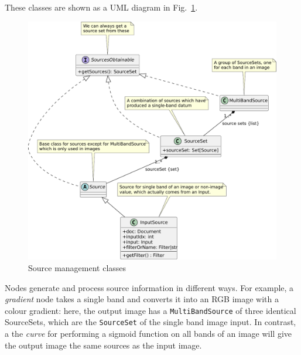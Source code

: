 These classes are shown as a UML diagram in Fig.~\ref{source.pdf}.
\clearpage
\begin{figure}[ht]
\center
\includegraphics[width=5in]{source.pdf}
\caption{Source management classes}
\label{source.pdf}
\end{figure}

Nodes generate and process source information in different ways. For example, a
\emph{gradient} node takes a single band and converts it into an RGB image
with a colour gradient: here, the output image has a \texttt{MultiBandSource} of three
identical SourceSets, which are the \texttt{SourceSet} of the single band image input.
In contrast, a the \emph{curve} for performing a
sigmoid function on all bands of an image will give the output image the
same sources as the input image.

